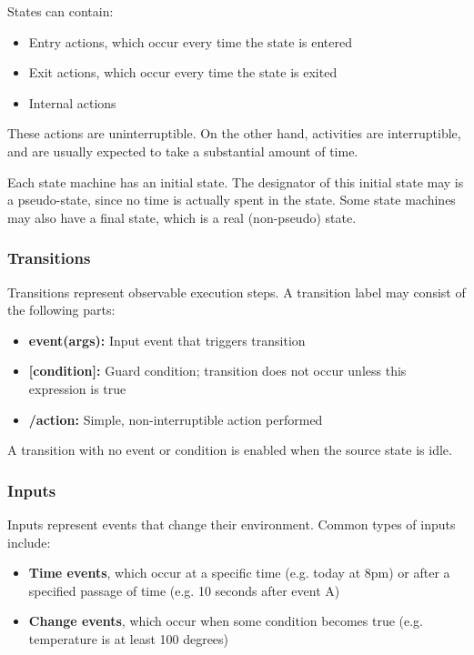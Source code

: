 \documentclass[12pt,titlepage]{article}
\begin{document}
        States can contain:
        \begin{itemize}
          \item Entry actions, which occur every time the state is entered
          \item Exit actions, which occur every time the state is exited
          \item Internal actions
        \end{itemize}

        These actions are uninterruptible. On the other hand, activities are interruptible, and are usually expected to take a substantial amount of time.

        Each state machine has an initial state. The designator of this initial state may is a pseudo-state, since no time is actually spent in the state.
        Some state machines may also have a final state, which is a real (non-pseudo) state.

      \subsubsection{Transitions}
        Transitions represent observable execution steps. A transition label may consist of the following parts:
        \begin{itemize}
          \item \textbf{event(args):} Input event that triggers transition
          \item \textbf{[condition]:} Guard condition; transition does not occur unless this expression is true
          \item \textbf{/action:} Simple, non-interruptible action performed
        \end{itemize}
        A transition with no event or condition is enabled when the source state is idle.

      \subsubsection{Inputs}
        Inputs represent events that change their environment. Common types of inputs include:
        \begin{itemize}
          \item \textbf{Time events}, which occur at a specific time (e.g. today at 8pm) or after a specified passage of time (e.g. 10 seconds after event A)
          \item \textbf{Change events}, which occur when some condition becomes true (e.g. temperature is at least 100 degrees)
        \end{itemize}
\end{document}
